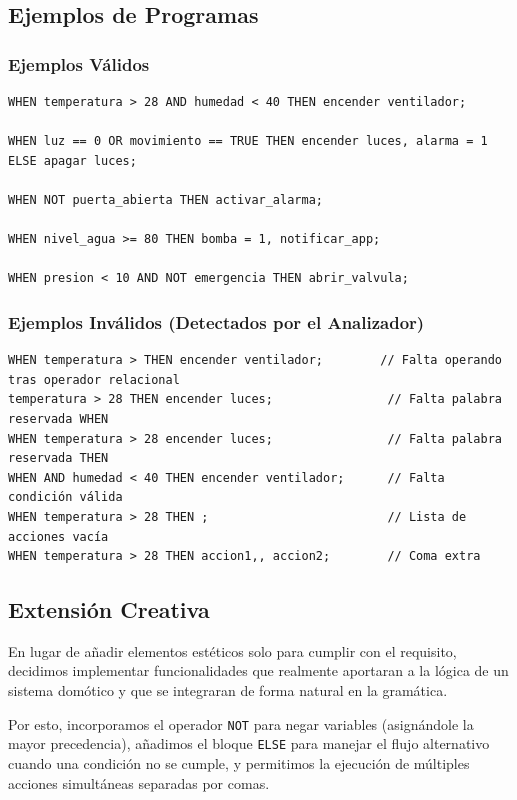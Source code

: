 \documentclass[12pt,a4paper]{article}
\begin{document}
\subsection{Ejemplos de Programas}

\subsubsection{Ejemplos Válidos}
\begin{lstlisting}[style=grammartyle, caption={Ejemplos válidos en SmartRule}, label={lst:validos}]
WHEN temperatura > 28 AND humedad < 40 THEN encender ventilador;

WHEN luz == 0 OR movimiento == TRUE THEN encender luces, alarma = 1 ELSE apagar luces;

WHEN NOT puerta_abierta THEN activar_alarma;

WHEN nivel_agua >= 80 THEN bomba = 1, notificar_app;

WHEN presion < 10 AND NOT emergencia THEN abrir_valvula;
\end{lstlisting}

\subsubsection{Ejemplos Inválidos (Detectados por el Analizador)}
\begin{lstlisting}[style=grammartyle, caption={Ejemplos inválidos en SmartRule}, label={lst:invalidos}]
WHEN temperatura > THEN encender ventilador;        // Falta operando tras operador relacional
temperatura > 28 THEN encender luces;                // Falta palabra reservada WHEN
WHEN temperatura > 28 encender luces;                // Falta palabra reservada THEN
WHEN AND humedad < 40 THEN encender ventilador;      // Falta condición válida
WHEN temperatura > 28 THEN ;                         // Lista de acciones vacía
WHEN temperatura > 28 THEN accion1,, accion2;        // Coma extra
\end{lstlisting}


\subsection{Extensión Creativa}
En lugar de añadir elementos estéticos solo para cumplir con el requisito, decidimos implementar funcionalidades que realmente aportaran a la lógica de un sistema domótico y que se integraran de forma natural en la gramática. 

Por esto, incorporamos el operador \texttt{NOT} para negar variables (asignándole la mayor precedencia), añadimos el bloque \texttt{ELSE} para manejar el flujo alternativo cuando una condición no se cumple, y permitimos la ejecución de múltiples acciones simultáneas separadas por comas.
\end{document}
